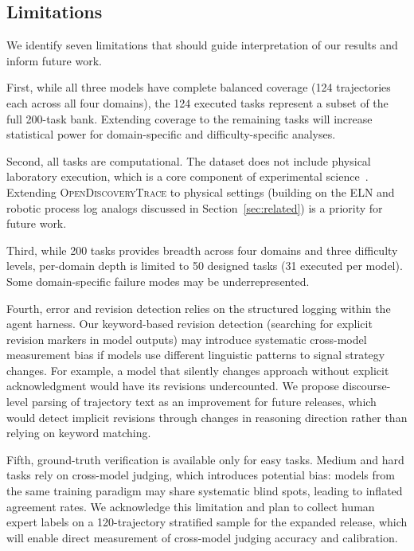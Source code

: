 \documentclass{article}
\newcommand{\dataset}{\textsc{OpenDiscoveryTrace}\xspace}
\newcommand{\ntasks}{200\xspace}
\begin{document}
\subsection{Limitations}
\label{sec:limitations}

We identify seven limitations that should guide interpretation of our results and inform future work.

First, while all three models have complete balanced coverage (124 trajectories each across all four domains), the 124 executed tasks represent a subset of the full 200-task bank. Extending coverage to the remaining tasks will increase statistical power for domain-specific and difficulty-specific analyses.

Second, all tasks are computational. The dataset does not include physical laboratory execution, which is a core component of experimental science~\citep{szymanski2023alab,boiko2023coscientist}. Extending \dataset to physical settings (building on the ELN and robotic process log analogs discussed in Section~\ref{sec:related}) is a priority for future work.

Third, while \ntasks tasks provides breadth across four domains and three difficulty levels, per-domain depth is limited to 50 designed tasks (31 executed per model). Some domain-specific failure modes may be underrepresented.

Fourth, error and revision detection relies on the structured logging within the agent harness. Our keyword-based revision detection (searching for explicit revision markers in model outputs) may introduce systematic cross-model measurement bias if models use different linguistic patterns to signal strategy changes. For example, a model that silently changes approach without explicit acknowledgment would have its revisions undercounted. We propose discourse-level parsing of trajectory text as an improvement for future releases, which would detect implicit revisions through changes in reasoning direction rather than relying on keyword matching.

Fifth, ground-truth verification is available only for easy tasks. Medium and hard tasks rely on cross-model judging, which introduces potential bias: models from the same training paradigm may share systematic blind spots, leading to inflated agreement rates. We acknowledge this limitation and plan to collect human expert labels on a 120-trajectory stratified sample for the expanded release, which will enable direct measurement of cross-model judging accuracy and calibration.
\end{document}
